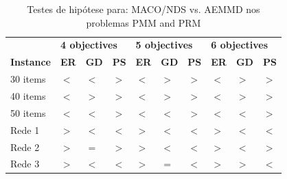 \begin{table}[htb]
	\centering
	\def\arraystretch{1.0}
	\caption{Testes de hipótese para: MACO/NDS vs. AEMMD nos problemas PMM and PRM}
	\label{tab_ztest_meams}
	\begin{tabular}{llllllllll}
		& \multicolumn{3}{l}{\textbf{4 objectives}} & \multicolumn{3}{l}{\textbf{5 objectives}} & \multicolumn{3}{l}{\textbf{6 objectives
		}} \\
		\textbf{Instance} & \textbf{ER} & \textbf{GD} & \textbf{PS} & \textbf{ER} & \textbf{GD} & \textbf{PS} & \textbf{ER} & \textbf{GD} & \textbf{PS} \\ \hline
		30 items & \cellcolor{table-green} $<$ & \cellcolor{table-green} $<$ & \cellcolor{table-green} $>$ & \cellcolor{table-green} $<$ & \cellcolor{table-red} $>$ & \cellcolor{table-green} $>$ & \cellcolor{table-green} $<$ & \cellcolor{table-red} $>$ & \cellcolor{table-green} $>$ \\
		40 items & \cellcolor{table-green} $<$ & \cellcolor{table-red} $>$ & \cellcolor{table-green} $>$ & \cellcolor{table-green} $<$ & \cellcolor{table-red} $>$ & \cellcolor{table-green} $>$ & \cellcolor{table-green} $<$ & \cellcolor{table-red} $>$ & \cellcolor{table-green} $>$ \\
		50 items & \cellcolor{table-green} $<$ & \cellcolor{table-green} $<$ & \cellcolor{table-green} $>$ & \cellcolor{table-green} $<$ & \cellcolor{table-green} $<$ & \cellcolor{table-green} $>$ & \cellcolor{table-green} $<$ & \cellcolor{table-green} $<$ & \cellcolor{table-green} $>$ \\  \hline 
		Rede 1 & \cellcolor{table-red} $>$ & \cellcolor{table-green} $<$ & \cellcolor{table-red} $<$ & \cellcolor{table-red} $>$ & \cellcolor{table-green} $<$ & \cellcolor{table-red} $<$ & \cellcolor{table-red} $>$ & \cellcolor{table-green} $<$ & \cellcolor{table-red} $<$ \\
		Rede 2 & \cellcolor{table-red} $>$ & \cellcolor{white} $=$ & \cellcolor{table-green} $>$ & \cellcolor{table-red} $>$ & \cellcolor{table-green} $<$ & \cellcolor{table-red} $<$ & \cellcolor{table-red} $>$ & \cellcolor{table-green} $<$ & \cellcolor{table-green} $>$ \\
		Rede 3 & \cellcolor{table-red} $>$ & \cellcolor{table-green} $<$ & \cellcolor{table-red} $<$ & \cellcolor{table-red} $>$ & \cellcolor{white} $=$ & \cellcolor{table-red} $<$ & \cellcolor{table-red} $>$ & \cellcolor{table-red} $>$ & \cellcolor{table-red} $<$ \\  \hline 
	\end{tabular}
\end{table}

